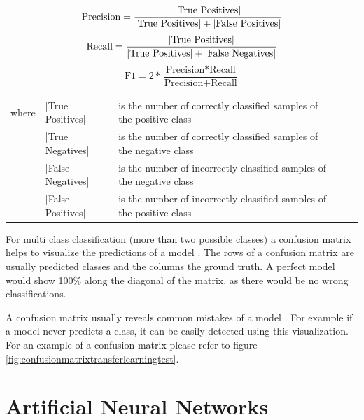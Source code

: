 \documentclass[draft,final,oneside]{vutinfth} %
\begin{document}
\begin{equation}
\text{Precision}=\frac{|\text{True Positives}|} {|\text{True Positives}| + |\text{False Positives}|}\\
\end{equation}
\begin{equation}
\text{Recall}=\frac{|\text{True Positives}|} {|\text{True Positives}| + |\text{False Negatives}|}\\
\end{equation}
\begin{equation}
\text{F1} = 2 * \frac{\text{Precision} * \text{Recall}}{\text{Precision} + \text{Recall}}
\end{equation}
\FloatBarrier
\begin{table}[h]
\begin{tabular}{lllll}
where & |True Positives| & is the number of correctly classified samples of the positive class \\
 & |True Negatives| & is the number of correctly classified samples of the negative class \\
 & |False Negatives| & is the number of incorrectly classified samples of the negative class \\
 & |False Positives| & is the number of incorrectly classified samples of the positive class 
\end{tabular}
\end{table}
\FloatBarrier
For multi class classification (more than two possible classes) a confusion matrix helps to visualize the predictions of a model \cite{accuracy}. The rows of a confusion matrix are usually predicted classes and the columns the ground truth. A perfect model would show 100\% along the diagonal of the matrix, as there would be no wrong classifications.

A confusion matrix usually reveals common mistakes of a model \cite{accuracy}. For example if a model never predicts a class, it can be easily detected using this visualization. For an example of a confusion matrix please refer to figure \ref{fig:confusionmatrixtransferlearningtest}.

\section{Artificial Neural Networks}
\end{document}
